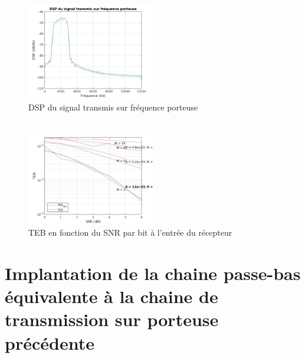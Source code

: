 \documentclass[a4paper, 12pt]{article}
\begin{document}
\begin{figure}[H]
    \centering
    \includegraphics[width=0.5\textwidth]{graphics/1-3.jpg}
    \caption{DSP du signal transmis sur fréquence porteuse} 
    \label{fig:mon_etiquette}
\end{figure}

\subsection{}

\subsection{}

\begin{figure}[H]
    \centering
    \includegraphics[width=0.5\textwidth]{graphics/1-5.jpg}
    \caption{TEB en fonction du SNR par bit à l'entrée du récepteur}
    \label{fig:mon_etiquette}
\end{figure}

\subsection{}

\clearpage
\section{Implantation de la chaine passe-bas équivalente à la chaine de transmission sur porteuse précédente}
\end{document}
